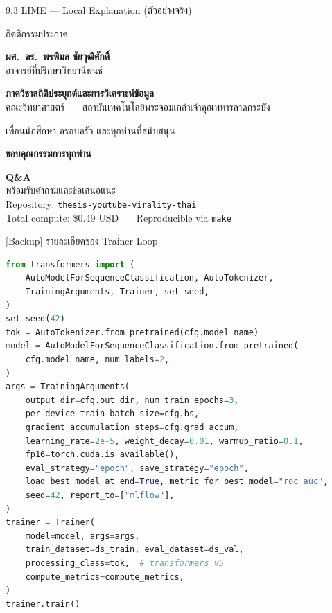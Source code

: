 \documentclass[aspectratio=169,11pt,xcolor=dvipsnames]{beamer}
\newcommand{\hl}[1]{\textcolor{kmitlOrange}{\textbf{#1}}}
\newcommand{\hlb}[1]{\textcolor{kmitlBlue}{\textbf{#1}}}
\begin{document}
\begin{frame}{9.3 LIME — Local Explanation (ตัวอย่างจริง)}
\begin{center}
\begin{frame}{กิตติกรรมประกาศ}
\begin{center}
    \hl{ผศ.\ ดร.\ พรพิมล ชัยวุฒิศักดิ์}\\
    อาจารย์ที่ปรึกษาวิทยานิพนธ์
    \vspace{0.6em}

    \hlb{ภาควิชาสถิติประยุกต์และการวิเคราะห์ข้อมูล}\\
    คณะวิทยาศาสตร์ \ \textbullet\ \ สถาบันเทคโนโลยีพระจอมเกล้าเจ้าคุณทหารลาดกระบัง
    \vspace{0.6em}

    เพื่อนนักศึกษา ครอบครัว และทุกท่านที่สนับสนุน
    \vspace{1.0em}

    \LARGE \hl{ขอบคุณกรรมการทุกท่าน}
  \end{center}
\end{frame}

\begin{frame}[plain]
  \vfill
  \begin{center}
    \Huge \hl{Q\&A}\\[1.5em]
    \large พร้อมรับคำถามและข้อเสนอแนะ\\[2em]
    \normalsize
    Repository: \texttt{thesis-youtube-virality-thai}\\
    Total compute: \$0.49 USD \ \textbullet\ \ Reproducible via \texttt{make}
  \end{center}
  \vfill
\end{frame}

\appendix

\begin{frame}{[Backup] รายละเอียดของ Trainer Loop}
  \footnotesize
  \begin{lstlisting}[language=Python]
from transformers import (
    AutoModelForSequenceClassification, AutoTokenizer,
    TrainingArguments, Trainer, set_seed,
)
set_seed(42)
tok = AutoTokenizer.from_pretrained(cfg.model_name)
model = AutoModelForSequenceClassification.from_pretrained(
    cfg.model_name, num_labels=2,
)
args = TrainingArguments(
    output_dir=cfg.out_dir, num_train_epochs=3,
    per_device_train_batch_size=cfg.bs,
    gradient_accumulation_steps=cfg.grad_accum,
    learning_rate=2e-5, weight_decay=0.01, warmup_ratio=0.1,
    fp16=torch.cuda.is_available(),
    eval_strategy="epoch", save_strategy="epoch",
    load_best_model_at_end=True, metric_for_best_model="roc_auc",
    seed=42, report_to=["mlflow"],
)
trainer = Trainer(
    model=model, args=args,
    train_dataset=ds_train, eval_dataset=ds_val,
    processing_class=tok,  # transformers v5
    compute_metrics=compute_metrics,
)
trainer.train()
  \end{lstlisting}
\end{frame}


\end{center}
\end{frame}
\end{document}
